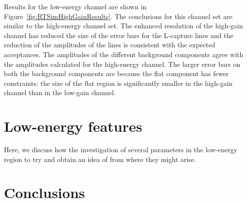 Results for the low-energy channel are shown in Figure~\ref{fig:RTSimHighGainResults}. The conclusions for this channel set are similar to the high-energy channel set.  The enhanced resolution of the high-gain channel has reduced the size of the error bars for the L-capture lines and the reduction of the amplitudes of the lines is consistent with the expected acceptances.  The amplitudes of the different background components agree with the amplitudes calculated for the high-energy channel.  The larger error bars on both the background components are because the flat component has fewer constraints: the size of the flat region is significantly smaller in the high-gain channel than in the low-gain channel.  


						\begin{sidewaysfigure}
							\centering
							\caption[Simulation results for high-gain BeGe channel]
							{Simulation results for high-gain channel.}
							\label{fig:RTSimHighGainResults}
						\end{sidewaysfigure}


	\section{Low-energy features}
	\label{sec:BeGeLowEnergyFeatures}
	
	Here, we discuss how the investigation of several parameters in the low-energy region to try and obtain an idea of from where they might arise.


	\section{Conclusions}
     	\label{sec:CutConclusions}				


